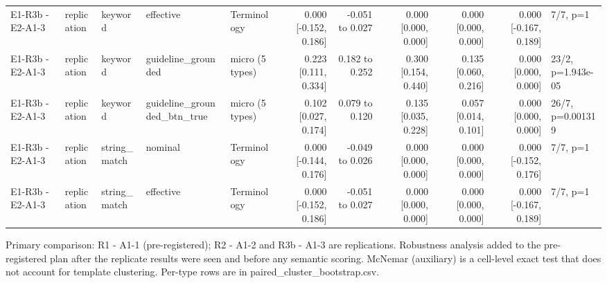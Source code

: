 \begin{table}[t]
\begin{tabular}{lllllrrrrrl}
E1-R3b - E2-A1-3 & replication & keyword & effective & Terminology & 0.000 [-0.152, 0.186] & -0.051 to 0.027 & 0.000 [0.000, 0.000] & 0.000 [0.000, 0.000] & 0.000 [-0.167, 0.189] & 7/7, p=1 \\
E1-R3b - E2-A1-3 & replication & keyword & guideline\_grounded & micro (5 types) & 0.223 [0.111, 0.334] & 0.182 to 0.252 & 0.300 [0.154, 0.440] & 0.135 [0.060, 0.216] & 0.000 [0.000, 0.000] & 23/2, p=1.943e-05 \\
E1-R3b - E2-A1-3 & replication & keyword & guideline\_grounded\_btn\_true & micro (5 types) & 0.102 [0.027, 0.174] & 0.079 to 0.120 & 0.135 [0.035, 0.228] & 0.057 [0.014, 0.101] & 0.000 [0.000, 0.000] & 26/7, p=0.001319 \\
E1-R3b - E2-A1-3 & replication & string\_match & nominal & Terminology & 0.000 [-0.144, 0.176] & -0.049 to 0.026 & 0.000 [0.000, 0.000] & 0.000 [0.000, 0.000] & 0.000 [-0.152, 0.176] & 7/7, p=1 \\
E1-R3b - E2-A1-3 & replication & string\_match & effective & Terminology & 0.000 [-0.152, 0.186] & -0.051 to 0.027 & 0.000 [0.000, 0.000] & 0.000 [0.000, 0.000] & 0.000 [-0.167, 0.189] & 7/7, p=1 \\
\bottomrule
\end{tabular}
\par\footnotesize Primary comparison: R1 - A1-1 (pre-registered); R2 - A1-2 and R3b - A1-3 are replications. Robustness analysis added to the pre-registered plan after the replicate results were seen and before any semantic scoring. McNemar (auxiliary) is a cell-level exact test that does not account for template clustering. Per-type rows are in paired\_cluster\_bootstrap.csv.
\end{table}
